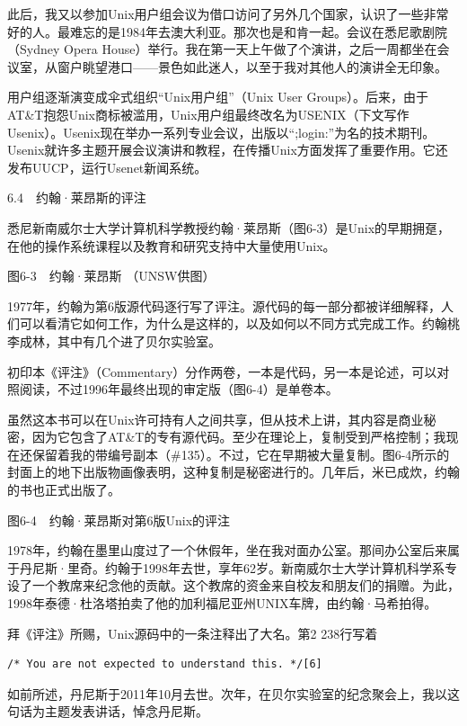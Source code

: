 \documentclass[a4paper,12pt,UTF8,twoside]{ctexbook}
\begin{document}
此后，我又以参加Unix用户组会议为借口访问了另外几个国家，认识了一些非常好的人。最难忘的是1984年去澳大利亚。那次也是和肯一起。会议在悉尼歌剧院（Sydney Opera House）举行。我在第一天上午做了个演讲，之后一周都坐在会议室，从窗户眺望港口——景色如此迷人，以至于我对其他人的演讲全无印象。

用户组逐渐演变成伞式组织“Unix用户组”（Unix User Groups）。后来，由于AT\&T抱怨Unix商标被滥用，Unix用户组最终改名为USENIX（下文写作Usenix）。Usenix现在举办一系列专业会议，出版以“;login:”为名的技术期刊。Usenix就许多主题开展会议演讲和教程，在传播Unix方面发挥了重要作用。它还发布UUCP，运行Usenet新闻系统。





6.4　约翰·莱昂斯的评注


悉尼新南威尔士大学计算机科学教授约翰·莱昂斯（图6-3）是Unix的早期拥趸，在他的操作系统课程以及教育和研究支持中大量使用Unix。



图6-3　约翰·莱昂斯 （UNSW供图）

1977年，约翰为第6版源代码逐行写了评注。源代码的每一部分都被详细解释，人们可以看清它如何工作，为什么是这样的，以及如何以不同方式完成工作。约翰桃李成林，其中有几个进了贝尔实验室。

初印本《评注》（Commentary）分作两卷，一本是代码，另一本是论述，可以对照阅读，不过1996年最终出现的审定版（图6-4）是单卷本。

虽然这本书可以在Unix许可持有人之间共享，但从技术上讲，其内容是商业秘密，因为它包含了AT\&T的专有源代码。至少在理论上，复制受到严格控制；我现在还保留着我的带编号副本（\#135）。不过，它在早期被大量复制。图6-4所示的封面上的地下出版物画像表明，这种复制是秘密进行的。几年后，米已成炊，约翰的书也正式出版了。



图6-4　约翰·莱昂斯对第6版Unix的评注

1978年，约翰在墨里山度过了一个休假年，坐在我对面办公室。那间办公室后来属于丹尼斯·里奇。约翰于1998年去世，享年62岁。新南威尔士大学计算机科学系专设了一个教席来纪念他的贡献。这个教席的资金来自校友和朋友们的捐赠。为此，1998年泰德·杜洛塔拍卖了他的加利福尼亚州UNIX车牌，由约翰·马希拍得。

拜《评注》所赐，Unix源码中的一条注释出了大名。第2 238行写着
\begin{lstlisting}
/* You are not expected to understand this. */[6]
\end{lstlisting}
如前所述，丹尼斯于2011年10月去世。次年，在贝尔实验室的纪念聚会上，我以这句话为主题发表讲话，悼念丹尼斯。
\end{document}
